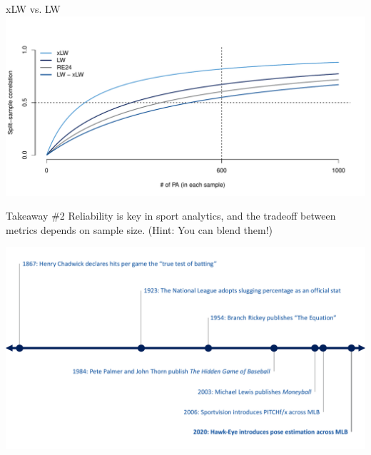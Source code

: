\documentclass[handout]{beamer}
\begin{document}
\begin{frame}{xLW vs. LW}
  \includegraphics[width = \textwidth]{figures/re24_lw_xlw_diff.pdf}
\end{frame}

\begin{frame}{Takeaway \#2}
  Reliability is key in sport analytics, and the tradeoff between metrics depends on sample size. (Hint: You can blend them!)
\end{frame}

\begin{frame}
  \includegraphics[width = \textwidth]{figures/timeline_2020.pdf}
\end{frame}
\end{document}
